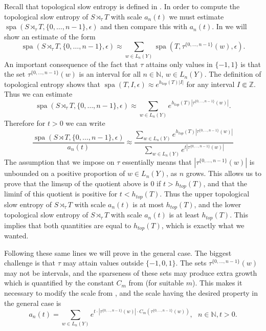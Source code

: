 \documentclass[a4paper,oneside]{amsart}
\renewcommand{\(}{\begin{dmath*}}
\renewcommand{\)}{\end{dmath*}}
\theoremstyle{definition}
\newcommand{\N}{\mathbb{N}}
\newcommand{\Z}{\mathbb{Z}}
\newcommand{\spa}{\operatorname{spa}}
\begin{document}
Recall that topological slow entropy is defined in  . In order to compute the topological slow entropy of $S\rtimes_\tau T$ with scale $a_n(t)$ we must estimate $\spa(S\rtimes_\tau T,\{0,\dots,n-1\},\epsilon)$ and then compare this with $a_n(t)$. In  we will show an estimate of the form 
\begin{equation}\label{informal-estimate-for-spa}
    \spa(S\rtimes_\tau T,\{0,\dots,n-1\},\epsilon)\approx\sum_{w\in L_n(Y)}\spa(T,\tau^{\{0,\dots,n-1\}}(w),\epsilon).
\end{equation}
An important consequence of the fact that $\tau$ attains only values in $\{-1,1\}$ is that the set $\tau^{\{0,\dots,n-1\}}(w)$ is an interval for all $n\in\N$, $w\in L_n(Y)$. The definition of topological entropy shows that $\spa(T,I,\epsilon)\approx e^{h_{top}(T)|I|}$ for any interval $I\Subset\Z$. Thus we can estimate
\[\spa(S\rtimes_\tau T,\{0,\dots,n-1\},\epsilon)\approx\sum_{w\in L_n(Y)}e^{h_{top}(T)|\tau^{\{0,\dots,n-1\}}(w)|}.\]
Therefore for $t>0$ we can write
\begin{equation}\label{quotient-to-analyze}
\frac{\spa(S\rtimes T,\{0,\dots,n-1\},\epsilon)}{a_n(t)}\approx \frac{\sum_{w\in L_n(Y)}e^{h_{top}(T)|\tau^{\{0,\dots,n-1\}}(w)|}}{\sum_{w\in L_n(Y)} e^{t|\tau^{\{0,\dots,n-1\}}(w)|}}
\end{equation}
The assumption that we impose on $\tau$ essentially means that $|\tau^{\{0,\dots,n-1\}}(w)|$ is unbounded on a positive proportion of $w\in L_{n}(Y)$, as $n$ grows. This allows us to prove that the limsup of the quotient above is $0$ if $t>h_{top}(T)$, and that the liminf of this quotient is positive for $t<h_{top}(T)$. Thus the upper topological slow entropy of $S\rtimes_{\tau}T$ with scale $a_n(t)$ is at most $h_{top}(T)$, and the lower topological slow entropy of $S\rtimes_{\tau}T$ with scale $a_n(t)$ is at least $h_{top}(T)$. This implies that both quantities are equal to $h_{top}(T)$, which is exactly what we wanted.

Following these same lines we will prove  in the general case. The biggest challenge is that $\tau$ may attain values outside $\{-1,0,1\}$. The sets $\tau^{\{0,\dots,n-1\}}(w)$ may not be intervals, and the sparseness of these sets may produce extra growth which is quantified by the constant $C_m$ from  (for suitable $m$). This makes it necessary to modify the scale from , and the scale having the desired property in the general case is
\[a_n(t)=\sum_{w\in L_n(Y)} e^{t\cdot |\tau^{\{0,\dots,n-1\}}(w)|\cdot C_m(\tau^{\{0,\dots,n-1\}}(w))}, \ \ \  n\in\N, t>0.\]
\end{document}
